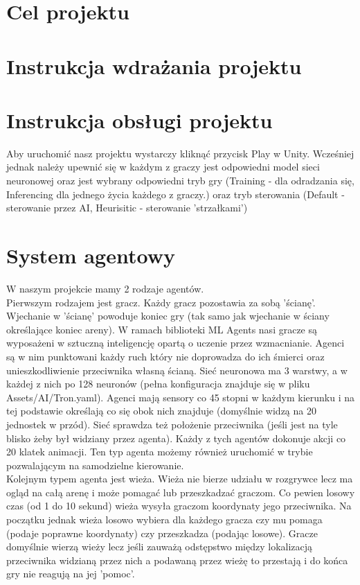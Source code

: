 \documentclass[12pt,a4paper]{article}
\begin{document}
\section{Cel projektu}

\section{Instrukcja wdrażania projektu}

\section{Instrukcja obsługi projektu}
Aby uruchomić nasz projektu wystarczy kliknąć przycisk Play w Unity. Wcześniej jednak należy upewnić się w każdym z graczy jest odpowiedni model sieci neuronowej oraz jest wybrany odpowiedni tryb gry (Training - dla odradzania się, Inferencing dla jednego życia każdego z graczy.) oraz tryb sterowania (Default - sterowanie przez AI, Heurisitic - sterowanie 'strzałkami') 

\section{System agentowy}
W naszym projekcie mamy 2 rodzaje agentów.\\
Pierwszym rodzajem jest gracz. Każdy gracz pozostawia za sobą 'ścianę'. Wjechanie w 'ścianę' powoduje koniec gry (tak samo jak wjechanie w ściany określające koniec areny). W ramach biblioteki ML Agents nasi gracze są wyposażeni w sztuczną inteligencję opartą o uczenie przez wzmacnianie. Agenci są w nim punktowani każdy ruch który nie doprowadza do ich śmierci oraz unieszkodliwienie przeciwnika własną ścianą. Sieć neuronowa ma 3 warstwy, a w każdej z nich po 128 neuronów (pełna konfiguracja znajduje się w pliku Assets/AI/Tron.yaml). Agenci mają sensory co 45 stopni w każdym kierunku i na tej podstawie określają co się obok nich znajduje (domyślnie widzą na 20 jednostek w przód). Sieć sprawdza też położenie przeciwnika (jeśli jest na tyle blisko żeby był widziany przez agenta). Każdy z tych agentów dokonuje akcji co 20 klatek animacji. Ten typ agenta możemy również uruchomić w trybie pozwalającym na samodzielne kierowanie.\\
Kolejnym typem agenta jest wieża. Wieża nie bierze udziału w rozgrywce lecz ma ogląd na całą arenę i może pomagać lub przeszkadzać graczom. Co pewien losowy czas (od 1 do 10 sekund) wieża wysyła graczom koordynaty jego przeciwnika. Na początku jednak wieża losowo wybiera dla każdego gracza czy mu pomaga (podaje poprawne koordynaty) czy przeszkadza (podając losowe). Gracze domyślnie wierzą wieży lecz jeśli zauważą odstępstwo między lokalizacją przeciwnika widzianą przez nich a podawaną przez wieżę to przestają i do końca gry nie reagują na jej 'pomoc'.
\end{document}
